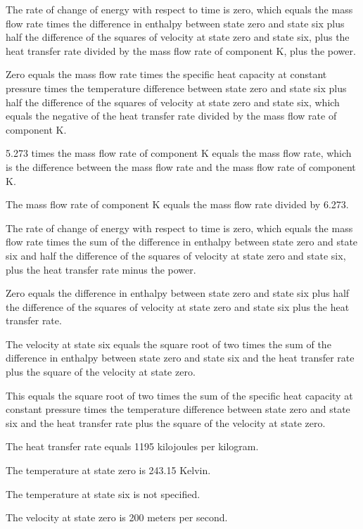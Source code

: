 The rate of change of energy with respect to time is zero, which equals the mass flow rate times the difference in enthalpy between state zero and state six plus half the difference of the squares of velocity at state zero and state six, plus the heat transfer rate divided by the mass flow rate of component K, plus the power.

Zero equals the mass flow rate times the specific heat capacity at constant pressure times the temperature difference between state zero and state six plus half the difference of the squares of velocity at state zero and state six, which equals the negative of the heat transfer rate divided by the mass flow rate of component K.

5.273 times the mass flow rate of component K equals the mass flow rate, which is the difference between the mass flow rate and the mass flow rate of component K.

The mass flow rate of component K equals the mass flow rate divided by 6.273.

The rate of change of energy with respect to time is zero, which equals the mass flow rate times the sum of the difference in enthalpy between state zero and state six and half the difference of the squares of velocity at state zero and state six, plus the heat transfer rate minus the power.

Zero equals the difference in enthalpy between state zero and state six plus half the difference of the squares of velocity at state zero and state six plus the heat transfer rate.

The velocity at state six equals the square root of two times the sum of the difference in enthalpy between state zero and state six and the heat transfer rate plus the square of the velocity at state zero.

This equals the square root of two times the sum of the specific heat capacity at constant pressure times the temperature difference between state zero and state six and the heat transfer rate plus the square of the velocity at state zero.

The heat transfer rate equals 1195 kilojoules per kilogram.

The temperature at state zero is 243.15 Kelvin.

The temperature at state six is not specified.

The velocity at state zero is 200 meters per second.